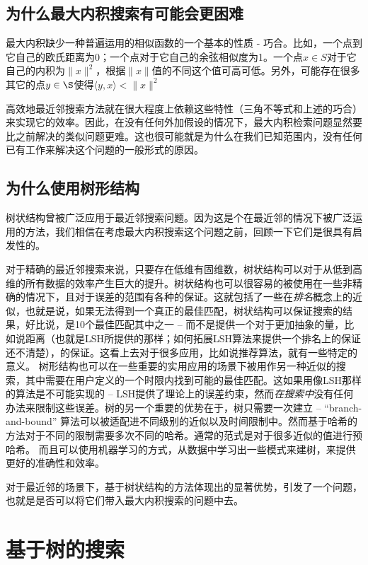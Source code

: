 \documentclass[twocolumn,a4paper]{article}
\begin{document}
\subsection{为什么最大内积搜索有可能会更困难}

最大内积缺少一种普遍运用的相似函数的一个基本的性质 - 巧合。比如，一个点到它自己的欧氏距离为0；一个点对于它自己的余弦相似度为1。一个点$x \in S$对于它自己的内积为$\|x\|^2$，根据$\|x\|$值的不同这个值可高可低。另外，可能存在很多其它的点$y \in \S$使得$\langle y,x \rangle < \|x\|^2$

高效地最近邻搜索方法就在很大程度上依赖这些特性（三角不等式和上述的巧合）来实现它的效率。因此，在没有任何外加假设的情况下，最大内积检索问题显然要比之前解决的类似问题更难。这也很可能就是为什么在我们已知范围内，没有任何已有工作来解决这个问题的一般形式的原因。

\subsection{为什么使用树形结构}

树状结构曾被广泛应用于最近邻搜索问题。因为这是个在最近邻的情况下被广泛运用的方法，我们相信在考虑最大内积搜索这个问题之前，回顾一下它们是很具有启发性的。

对于精确的最近邻搜索来说，只要存在低维有固维数，树状结构可以对于从低到高维的所有数据的效率产生巨大的提升。树状结构也可以很容易的被使用在一些非精确的情况下，且对于误差的范围有各种的保证。这就包括了一些在\emph{排名}概念上的近似，也就是说，如果无法得到一个真正的最佳匹配，树状结构可以保证搜索的结果，好比说，是10个最佳匹配其中之一 -- 而不是提供一个对于更加抽象的量，比如说距离（也就是LSH所提供的那样；如何拓展LSH算法来提供一个排名上的保证还不清楚），的保证。这看上去对于很多应用，比如说推荐算法，就有一些特定的意义。
树形结构也可以在一些重要的实用应用的场景下被用作另一种近似的搜索，其中需要在用户定义的一个时限内找到可能的最佳匹配。这如果用像LSH那样的算法是不可能实现的 -- LSH提供了理论上的误差约束，然而\emph{在搜索中}没有任何办法来限制这些误差。树的另一个重要的优势在于，树只需要一次建立 -- “branch-and-bound” 算法可以被适配进不同级别的近似以及时间限制中。然而基于哈希的方法对于不同的限制需要多次不同的哈希。通常的范式是对于很多近似的值进行预哈希。
而且可以使用机器学习的方式，从数据中学习出一些模式来建树，来提供更好的准确性和效率。

对于最近邻的场景下，基于树状结构的方法体现出的显著优势，引发了一个问题，也就是是否可以将它们带入最大内积搜索的问题中去。

\section{基于树的搜索}
\end{document}
